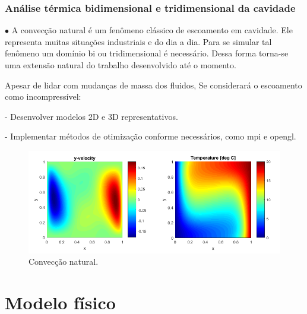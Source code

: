 \documentclass[xcolor=dvipsnames,10pt,aspectratio=169]{beamer}
\begin{document}
	\begin{frame}
		\frametitle{Análise térmica bidimensional e tridimensional da cavidade}
		$\bullet$ A convecção natural é um fenômeno clássico de escoamento em cavidade. Ele representa muitas situações industriais e do dia a dia.
		Para se simular tal fenômeno um domínio bi ou tridimensional é necessário. Dessa forma torna-se uma extensão natural do trabalho desenvolvido até o momento.

		Apesar de lidar com mudanças de massa dos fluidos, Se considerará o escoamento como incompressível:

		- Desenvolver modelos 2D e 3D representativos.

		- Implementar métodos de otimização conforme necessários, como mpi e opengl.

		\begin{figure}[h!]
			\centering
			\includegraphics[trim = {1.7cm 2cm 0 1cm}, clip , angle=0, scale=0.50]{images/NaturalConvectionFromNet}
			\caption{Convecção natural.}
		\end{figure}

	\end{frame}





\section{Modelo físico}
\end{document}

